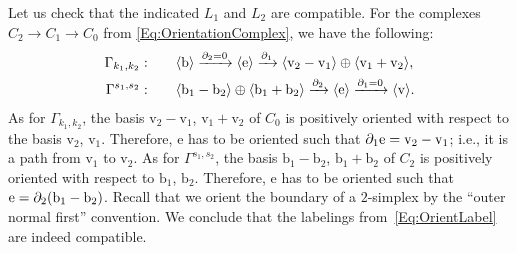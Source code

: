 \documentclass[\MainFolder/Text.tex]{subfiles}
\begin{document}
\begin{Example}
Let us check that the indicated $L_1$ and $L_2$ are compatible. For the complexes $C_2 \rightarrow C_1 \rightarrow C_0$ from \eqref{Eq:OrientationComplex}, we have the following:
\[\begin{aligned}
\Gamma_{k_1,k_2}:\qquad &\langle \mathrm{b} \rangle \xrightarrow{\partial_2 = 0}  \langle \mathrm{e} \rangle \xrightarrow{\partial_1} \langle \mathrm{v}_2 - \mathrm{v}_1 \rangle \oplus \langle \mathrm{v}_1 + \mathrm{v}_2 \rangle,  \\
\Gamma^{s_1, s_2}:\qquad &\langle \mathrm{b}_1 - \mathrm{b}_2 \rangle \oplus \langle \mathrm{b}_1 + \mathrm{b}_2 \rangle  \xrightarrow{\partial_2} \langle \mathrm{e} \rangle \xrightarrow{\partial_1 = 0} \langle \mathrm{v} \rangle.  
\end{aligned}\]
As for $\Gamma_{k_1,k_2}$, the basis $\mathrm{v}_2 - \mathrm{v}_1$, $\mathrm{v}_1 + \mathrm{v}_2$ of $C_0$ is positively oriented with respect to the basis $\mathrm{v}_2$, $\mathrm{v}_1$. Therefore, $\mathrm{e}$ has to be oriented such that $\partial_1 \mathrm{e} = \mathrm{v}_2 - \mathrm{v}_1$; i.e., it is a path from $\mathrm{v}_1$ to $\mathrm{v}_2$. As for $\Gamma^{s_1,s_2}$, the basis $\mathrm{b}_1-\mathrm{b}_2$, $\mathrm{b}_1 + \mathrm{b}_2$ of $C_2$ is positively oriented with respect to $\mathrm{b}_1$, $\mathrm{b}_2$. Therefore, $\mathrm{e}$ has to be oriented such that $\mathrm{e} = \partial_2 (\mathrm{b}_1 - \mathrm{b}_2)$. Recall that we orient the boundary of a $2$-simplex by the ``outer normal first'' convention. We conclude that the labelings from~\eqref{Eq:OrientLabel} are indeed compatible.


\end{Example}
\end{document}
